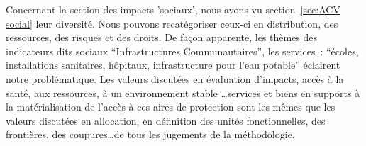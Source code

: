 
Concernant la section des impacts 'sociaux', nous avons vu section~\ref{sec:ACV social} leur diversité.
%
Nous pouvons recatégoriser ceux-ci en distribution, des ressources, des risques et des droits.
De façon apparente, les thèmes des indicateurs dits sociaux ``Infrastructures Communautaires'', les services~: ``écoles, installations sanitaires, hôpitaux, infrastructure pour l'eau potable'' éclairent notre problématique.
Les valeurs discutées en évaluation d'impacts, accès à la santé, aux ressources, à un environnement stable \ldots services et biens en supports à la matérialisation de l'accès à ces aires de protection sont les mêmes que les valeurs discutées en allocation, en définition des unités fonctionnelles, des frontières, des coupures\ldots de tous les jugements de la méthodologie.

